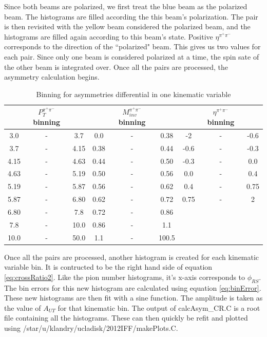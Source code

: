 \documentclass[abstract = on,listof=totoc, bibliography=totoc]{scrreprt}
\newcommand{\phirs}{\phi_{RS}}
\newcommand{\ptpair}{P_{T}^{\pi^+\pi^-}}
\newcommand{\mpair}{M_{inv}^{\pi^+\pi^-}}
\newcommand{\etapair}{\eta^{\pi^+\pi^-}}
\begin{document}
Since both beams are polarized, we first treat the blue beam as the polarized beam. The histograms are filled according the this beam's polarization. The pair is then revisited with the yellow beam considered the polarized beam, and the histograms are filled again according to this beam's state. Positive $\etapair$ corresponds to the direction of the ``polarized" beam. This gives us two values for each pair. Since only one beam is considered polarized at a time, the spin sate of the other beam is integrated over. Once all the pairs are processed, the asymmetry calculation begins. 
\begin{center}
\begin{table}[h!]
\caption{Binning for asymmetries differential in one kinematic variable}
\small
\begin{tabular}{c c c|c c c|c c c} 
\\
 & $\ptpair$ binning &  & & $\mpair$ binning & & & $\etapair$ binning &	\\ \hline
3.0 & - & 3.7	& 0.0 & - & 0.38&-2 & - & -0.6\\
3.7 & - & 4.15	&0.38 & - & 0.44&-0.6 & - & -0.3\\
4.15 & - & 4.63 &0.44 & - & 0.50	&-0.3 & - & 0.0	\\
4.63 & - & 5.19&0.50 & - & 0.56&0.0 & - & 0.4\\
5.19 & - & 5.87&0.56 & - & 0.62&0.4 & - & 0.75\\
5.87 & - & 6.80&0.62 & - & 0.72&0.75 & - &2\\
6.80 & - &7.8&0.72 & - & 0.86&\\
7.8 & - & 10.0&0.86 & - & 1.1&\\
10.0 & - & 50.0&1.1 & - & 100.5&\\
\end{tabular}
\label{tab:1dbinning}
\end{table}
\end{center}

Once all the pairs are processed, another histogram is created for each kinematic variable bin. It is contructed to be the right hand side of equation \ref{eq:crossRatio2}. Like the pion number histograms, it's x-axis corresponds to $\phirs$. The bin errors for this new histogram are calculated using equation \ref{eq:binError}. These new histograms are then fit with a sine function. The amplitude is taken as the value of $A_{UT}$ for that kinematic bin. The output of calcAsym\_CR.C is a root file containing all the histograms. These can then quickly be refit and plotted using /star/u/klandry/ucladisk/2012IFF/makePlots.C.
\end{document}
